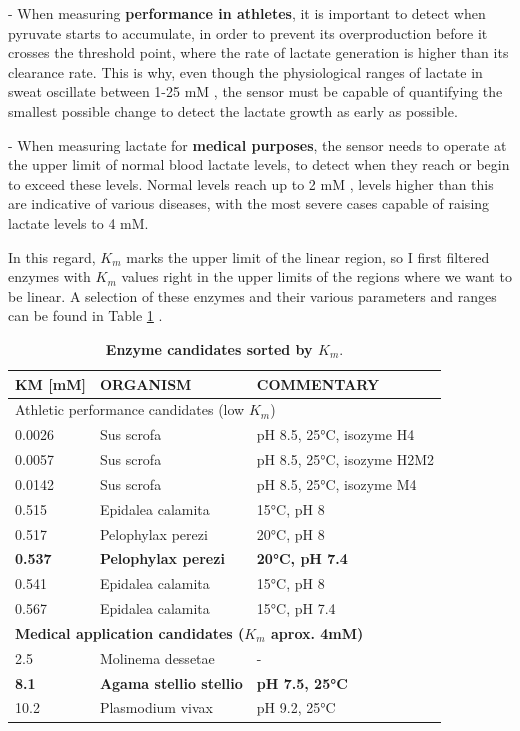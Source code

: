 \documentclass[conference]{IEEEtran}
\begin{document}
- When measuring \textbf{performance in athletes}, it is important to detect when pyruvate starts to accumulate, in order to prevent its overproduction before 
it crosses the threshold point, where the rate of lactate generation is higher than its clearance rate. This is why, even though the physiological 
ranges of lactate in sweat oscillate between 1-25 mM \cite{derbyshireLactateHumanSweat2012}, the sensor must be capable of quantifying the smallest 
possible change to detect the lactate growth as early as possible.

- When measuring lactate for \textbf{medical purposes}, the sensor needs to operate at the upper limit of normal blood lactate levels, to detect when they reach
 or begin to exceed these levels. Normal levels reach up to 2 mM \cite{LacticAcidosisBackground2020}, levels higher than this are indicative of various
  diseases, with the most severe cases capable of raising lactate levels to 4 mM.

In this regard, \(K_m\) marks the upper limit of the linear region, so I first filtered enzymes with \(K_m\) values right in the upper limits of the regions where we want
 to be linear. A selection of these enzymes and their various parameters and ranges can be found in Table \ref{tab:enzymes_athletic} .

 \begin{table}[h]
   \centering
   \caption{\textbf{Enzyme candidates sorted by \(K_m\)}\cite{InformationEC27}.}
   \label{tab:enzymes_athletic}
   \begin{tabular}{lll}
   \hline
   \textbf{KM [mM]} & \textbf{ORGANISM} & \textbf{COMMENTARY} \\
   \hline
   \multicolumn{3}{l}{Athletic performance candidates (low \(K_m\))} \\
   \hline
   0.0026 & Sus scrofa & pH 8.5, 25°C, isozyme H4 \\
   0.0057 & Sus scrofa & pH 8.5, 25°C, isozyme H2M2 \\
   0.0142 & Sus scrofa & pH 8.5, 25°C, isozyme M4 \\
   0.515 & Epidalea calamita & 15°C, pH 8 \\
   0.517 & Pelophylax perezi & 20°C, pH 8 \\
   \textbf{0.537} & \textbf{Pelophylax perezi} & \textbf{20°C, pH 7.4} \\
   0.541 & Epidalea calamita & 15°C, pH 8 \\
   0.567 & Epidalea calamita & 15°C, pH 7.4 \\
   \hline
   \multicolumn{3}{l}{\textbf{Medical application candidates (\(K_m\) aprox. 4mM)}} \\
   \hline
   2.5  & Molinema dessetae & - \\
   \textbf{8.1}  & \textbf{Agama stellio stellio} & \textbf{pH 7.5, 25°C} \\
   10.2 & Plasmodium vivax & pH 9.2, 25°C \\
   \hline
   \end{tabular}
   \end{table}
   
\end{document}
